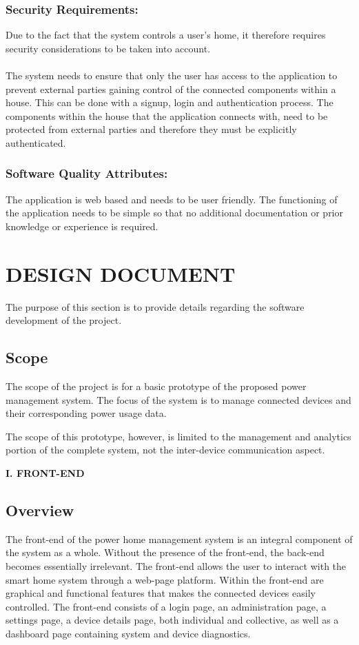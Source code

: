 \documentclass[10pt,twocolumn]{witseiepaper}
\begin{document}
	\subsubsection{Security Requirements:}
	Due to the fact that the system controls a user's home, it therefore requires security considerations to be taken into account.
	\\\\
	The system needs to ensure that only the user has access to the application to prevent external parties gaining control of the connected components within a house. This can be done with a signup, login and authentication process. 
	The components within the house that the application connects with, need to be protected from external parties and therefore they must be explicitly authenticated. 
	
	\subsubsection{Software Quality Attributes:}
	The application is web based and needs to be user friendly. The functioning of the application needs to be simple so that no additional documentation or prior knowledge or experience is required. 
	
	\section{DESIGN DOCUMENT}
	
	The purpose of this section is to provide details regarding the software development of the project. 
	
	\subsection{Scope}
	The scope of the project is for a basic prototype of the proposed power management system. The focus of the system is to manage connected devices and their corresponding power usage data. 
	
	The scope of this prototype, however, is limited to the management and analytics portion of the complete system, not the inter-device communication aspect. 
	
	\begin{center}
		\textbf{I. FRONT-END}
	\end{center}
	
	\subsection{Overview}
	The front-end of the power home management system is an integral component of the system as a whole. Without the presence of the front-end, the back-end becomes essentially irrelevant. The front-end allows the user to interact with the smart home system through a web-page platform. Within the front-end are graphical and functional features that makes the connected devices easily controlled. The front-end consists of a login page, an administration page, a settings page, a device details page, both individual and collective, as well as a dashboard page containing system and device diagnostics.
	
\end{document}
